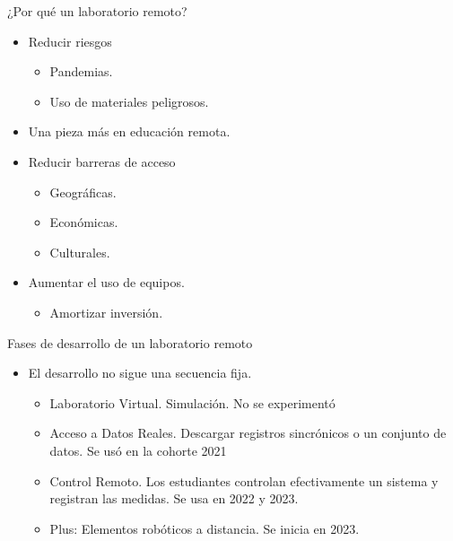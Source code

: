\begin{frame}{¿Por qué un laboratorio remoto?}
\begin{itemize}
    \item Reducir riesgos
    \begin{itemize}
        \item Pandemias.
        \item Uso de materiales peligrosos.
    \end{itemize}
    \item Una pieza más en educación remota.
    \item Reducir barreras de acceso
    \begin{itemize}
        \item Geográficas.
        \item Económicas.
        \item Culturales.
    \end{itemize}
    \item Aumentar el uso de equipos.
    \begin{itemize}
        \item Amortizar inversión.
    \end{itemize}
\end{itemize}
\end{frame}

\begin{frame}{Fases de desarrollo de un laboratorio remoto}
\begin{itemize}
    \item El desarrollo no sigue una secuencia fija.
    \begin{itemize}
        \item Laboratorio Virtual. Simulación. No se experimentó
        \item Acceso a Datos Reales. Descargar registros sincrónicos o un conjunto de datos. Se usó en la cohorte 2021
        \item Control Remoto. Los estudiantes controlan efectivamente un sistema y registran las medidas. Se usa en 2022 y 2023.
        \item Plus: Elementos robóticos a distancia. Se inicia en 2023.
    \end{itemize}
\end{itemize}
\end{frame}


